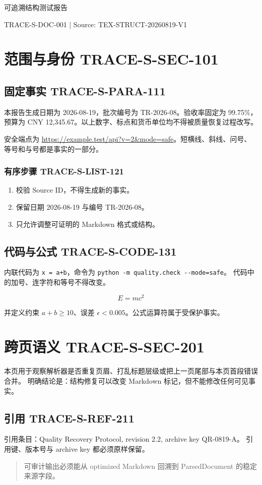 \documentclass[11pt,a4paper]{ctexart}
\begin{document}
\begin{center}
  {\LARGE 可追溯结构测试报告}\par
  \vspace{4pt}
  {\small TRACE-S-DOC-001 | Source: TEX-STRUCT-20260819-V1}
\end{center}

\section{范围与身份 TRACE-S-SEC-101}
\subsection{固定事实 TRACE-S-PARA-111}
本报告生成日期为 2026-08-19，批次编号为 TR-2026-08。验收率固定为
99.75\%，预算为 CNY 12,345.67。以上数字、标点和货币单位均不得被质量恢复过程改写。

安全端点为 \url{https://example.test/api?v=2&mode=safe}。短横线、斜线、问号、
等号和与号都是事实的一部分。

\subsubsection{有序步骤 TRACE-S-LIST-121}
\begin{enumerate}
  \item 校验 Source ID，不得生成新的事实。
  \item 保留日期 2026-08-19 与编号 TR-2026-08。
  \item 只允许调整可证明的 Markdown 格式或结构。
\end{enumerate}

\subsection{代码与公式 TRACE-S-CODE-131}
内联代码为 \verb|x = a+b|，命令为 \verb|python -m quality.check --mode=safe|。
代码中的加号、连字符和等号不得改变。

\begin{equation}
E = mc^2
\tag{TRACE-S-MATH-141}
\end{equation}

并定义约束 $a+b\geq 10$、误差 $\epsilon<0.005$。公式运算符属于受保护事实。

\newpage
\section{跨页语义 TRACE-S-SEC-201}
本页用于观察解析器是否重复页眉、打乱标题层级或把上一页尾部与本页首段错误合并。
明确结论是：结构修复可以改变 Markdown 标记，但不能修改任何可见事实。

\subsection{引用 TRACE-S-REF-211}
引用条目：Quality Recovery Protocol, revision 2.2, archive key QR-0819-A。
引用键、版本号与 archive key 都必须原样保留。

\begin{quote}
可审计输出必须能从 optimized Markdown 回溯到 ParsedDocument 的稳定来源字段。
\end{quote}
\end{document}

